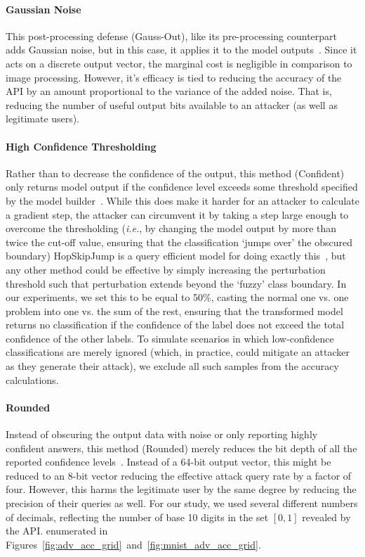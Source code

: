 \documentclass[lettersize,journal]{IEEEtran}
\newcommand{\ie}{\textit{i.e.}\xspace}
\begin{document}
\paragraph{Gaussian Noise}
This post-processing defense (Gauss-Out), like its pre-processing counterpart adds Gaussian noise, but in this case, it applies it to the model outputs~\cite{gauss_out}. Since it acts on a discrete output vector, the marginal cost is negligible in comparison to image processing. However, it's efficacy is tied to reducing the accuracy of the API by an amount proportional to the variance of the added noise. That is, reducing the number of useful output bits available to an attacker (as well as legitimate users).

\paragraph{High Confidence Thresholding}
Rather than to decrease the confidence of the output, this method (Confident) only returns model output if the confidence level exceeds some threshold specified by the model builder~\cite{high_conf}. While this does make it harder for an attacker to calculate a gradient step, the attacker can circumvent it by taking a step large enough to overcome the thresholding (\ie, by changing the model output by more than twice the cut-off value, ensuring that the classification `jumps over' the obscured boundary) HopSkipJump is a query efficient model for doing exactly this~\cite{hopskipjump}, but any other method could be effective by simply increasing the perturbation threshold such that perturbation extends beyond the `fuzzy' class boundary. In our experiments, we set this to be equal to 50\%, casting the normal one vs. one problem into one vs. the sum of the rest, ensuring that the transformed model returns no classification if the confidence of the label does not exceed the total confidence of the other labels. To simulate scenarios in which low-confidence classifications are merely ignored (which, in practice, could mitigate an attacker as they generate their attack), we exclude all such samples from the accuracy calculations.


\paragraph{Rounded}
Instead of obscuring the output data with noise or only reporting highly confident answers, this method (Rounded) merely reduces the bit depth of all the reported confidence levels~\cite{discretization}. Instead of a 64-bit output vector, this might be reduced to an 8-bit vector reducing the effective attack query rate by a factor of four. However, this harms the legitimate user by the same degree by reducing the precision of their queries as well. For our study, we used several different numbers of decimals, reflecting the number of base 10 digits in the set $[0,1]$ revealed by the API. enumerated in Figures~\ref{fig:adv_acc_grid}~and~\ref{fig:mnist_adv_acc_grid}.
\end{document}
